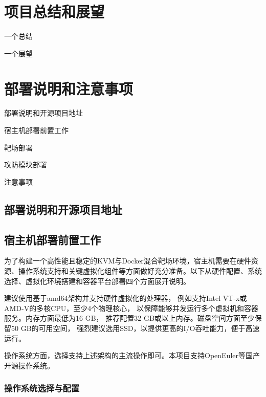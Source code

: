 \documentclass[lang=cn,10pt]{elegantbook}
\begin{document}
\chapter{项目总结和展望}
\begin{introduction}
  \item 一个总结
  \item 一个展望
\end{introduction}


\chapter{部署说明和注意事项}

\begin{introduction}
    \item 部署说明和开源项目地址
    \item 宿主机部署前置工作
    \item 靶场部署
    \item 攻防模块部署
    \item 注意事项
\end{introduction}

\section{部署说明和开源项目地址}

\section{宿主机部署前置工作}

为了构建一个高性能且稳定的KVM与Docker混合靶场环境，宿主机需要在硬件资源、操作系统支持和关键虚拟化组件等方面做好充分准备。以下从硬件配置、系统选择、虚拟化环境搭建和容器平台部署四个方面展开说明。

\begin{proposition}
建议使用基于amd64架构并支持硬件虚拟化的处理器，
例如支持Intel VT-x或AMD-V的多核CPU，至少4个物理核心，
以保障能够并发运行多个虚拟机和容器服务。内存方面最低为16 GB，
推荐配置32 GB或以上内存。磁盘空间方面至少保留50 GB的可用空间，
强烈建议选用SSD，以提供更高的I/O吞吐能力，便于高速运行。

操作系统方面，选择支持上述架构的主流操作即可。本项目支持OpenEuler等国产开源操作系统。
\end{proposition}


\subsection{操作系统选择与配置}
\end{document}
